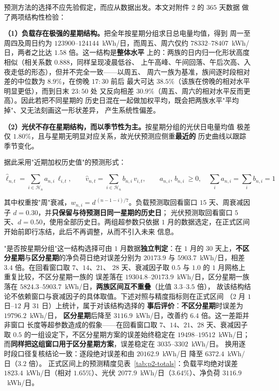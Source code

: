 \documentclass[withoutpreface,bwprint]{cumcmthesis}
\begin{document}
预测方法的选择不应先验假定，而应从数据出发。本文对附件 2 的 $365$ 天数据
做了两项结构性检验：

\textbf{（1）负载存在极强的星期结构。}把全年按星期分组求日总电量均值，得到
周一至周四及周日约为 $123900$--$124144$~kWh/日，而周五、周六仅约
$78332$--$78407$~kWh/日，两者之比达 $1.58$ 倍。这一结构是\textbf{整体水平}
上的：两族的日内归一化形状高度相似（相关系数 $0.888$，同样呈现凌晨低谷、
上午高峰、午间回落、午后次高、入夜走低的形态），但并不完全一致——以周五、
周六一族为基准，族间逐时段相对差的中位数为 $8.9\%$，在傍晚 $17{:}30$ 前后
最大可达 $38.5\%$（该族在傍晚的相对水平明显更低），而到日末 $23{:}50$ 处
又反向相差 $30.9\%$（周五、周六的相对水平反而更高）。因此若把不同星期的
历史日混在一起做加权平均，既会把两族水平"平均掉"、又无法刻画这一形状差异，
产生系统性偏差。

\textbf{（2）光伏不存在星期结构，而以季节性为主。}按星期分组的光伏日电量均值
极差仅 $1.80\%$，且与星期无明显对应关系，故光伏预测应侧重\textbf{最近的}
历史曲线以跟踪季节变化。

据此采用"近期加权历史值"的预测形式：

\begin{equation}
  \widehat{\ell}_{n,t}=\sum_{i\in\mathcal{H}_n}a_{n,i}\,\ell_{i,t},
  \qquad
  \widehat{v}_{n,t}=\sum_{i\in\mathcal{H}_n}b_{n,i}\,v_{i,t},
  \qquad
  a_{n,i},\,b_{n,i}\ \ge 0,\quad \sum_i a_{n,i}=\sum_i b_{n,i}=1
  \label{eq:p2-forecast}
\end{equation}

其中权重按"周"衰减，$w_{n,i}=d^{\,(n-1-i)/7}$。负载预测取回看窗口
$15$ 天、周衰减因子 $d=0.30$，并\textbf{只保留与待预测日同一星期的历史日}；
光伏预测取回看窗口 $5$ 天、$d=0.50$，使用全部历史日。两组超参数只依据
$1$ 月的数据选定，在正式区间开始前即行冻结，此后不再调整，从而不引入未来
信息。

"是否按星期分组"这一结构选择可由 $1$ 月数据\textbf{独立判定}：在 $1$ 月的
$30$ 天上，\textbf{不区分星期}与\textbf{区分星期}的净负荷日绝对误差分别为
$20173.9$ 与 $5903.7$~kWh/日，相差 $3.4$ 倍。在回看窗口取 $7$、$14$、$21$、
$28$ 天、衰减因子取 $0.5$ 与 $1.0$ 的 $1$ 月网格上重复比较，不区分星期一族的
误差落在 $19304.8$--$20173.9$~kWh/日，区分星期一族落在
$5824.3$--$5903.7$~kWh/日，\textbf{两族区间互不重叠}（比值 $3.3$--$3.5$ 倍），
故该结构结论不依赖窗口与衰减因子的具体取值。下述对照与精度指标则在正式区间
（$2$ 月 $1$ 日--$12$ 月 $31$ 日）上统计，属于对该结构选择的
\textbf{事后评价}：\textbf{不区分星期}时误差为 $19796.2$~kWh/日，
\textbf{区分星期}后降至 $3116.9$~kWh/日，改善约 $6.4$ 倍。这一差距并非窗口
长度等超参数造成的假象——在回看窗口取 $7$、$14$、$21$、$28$ 天、衰减因子取
$0.5$ 的一组设定下，不区分星期方案的误差始终稳定在 $19498$--$19512$~kWh/日；
而\textbf{同样把这组窗口用于区分星期方案}，误差稳定在 $3035$--$3302$~kWh/日。
换用逐时段口径复核结论一致：逐段绝对误差和由 $20162.9$~kWh/日
降至 $6372.4$~kWh/日（$3.2$ 倍）。
正式区间上的预测精度见表~\ref{tab:p2-totals}：负载平均绝对误差
$1823.4$~kWh/日（相对 $1.65\%$）、光伏 $2077.9$~kWh/日（$3.64\%$）、净负荷
$3116.9$~kWh/日。
\end{document}
